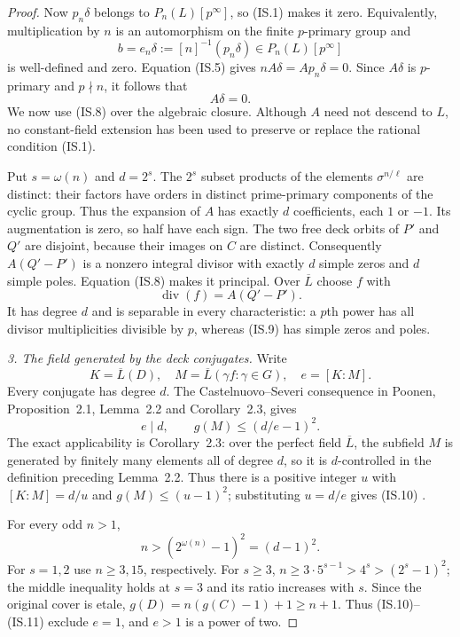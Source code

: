 \begin{proof}
Now $p_n\delta$ belongs to $P_n(L)[p^\infty]$, so (IS.1)
makes it zero. Equivalently, multiplication by $n$ is an
automorphism on the finite $p$-primary group and
\[
 b=e_n\delta:=[n]^{-1}(p_n\delta)
                      \in P_n(L)[p^\infty]
 \tag{IS.7}
\]
is well-defined and zero. Equation (IS.5) gives
$nA\delta=Ap_n\delta=0$. Since $A\delta$ is $p$-primary and
$p\nmid n$, it follows that
\[
                               A\delta=0.
 \tag{IS.8}
\]
We now use (IS.8) over the algebraic closure. Although $A$ need
not descend to $L$, no constant-field extension has been used
to preserve or replace the rational condition (IS.1).

Put $s=\omega(n)$ and $d=2^s$. The $2^s$ subset products of the
elements $\sigma^{n/\ell}$ are distinct: their factors have
orders in distinct prime-primary components of the cyclic
group. Thus the expansion of $A$ has exactly $d$ coefficients,
each $1$ or $-1$. Its augmentation is zero, so half have each
sign. The two free deck orbits of $P'$ and $Q'$ are disjoint,
because their images on $C$ are distinct. Consequently
$A(Q'-P')$ is a nonzero integral divisor with exactly $d$
simple zeros and $d$ simple poles. Equation (IS.8) makes it
principal. Over $\overline L$ choose $f$ with
\[
                       \operatorname{div}(f)=A(Q'-P').
 \tag{IS.9}
\]
It has degree $d$ and is separable in every characteristic:
a $p$th power has all divisor multiplicities divisible by $p$,
whereas (IS.9) has simple zeros and poles.

\emph{3. The field generated by the deck conjugates.}
Write
\[
 K=\overline L(D),\quad
 M=\overline L(\gamma f:\gamma\in G),\quad e=[K:M].
\]
Every conjugate has degree $d$. The Castelnuovo--Severi
consequence in Poonen, Proposition~2.1, Lemma~2.2 and
Corollary~2.3, gives
\[
                    e\mid d,
                    \qquad g(M)\le(d/e-1)^2.
 \tag{IS.10}
\]
The exact applicability is Corollary~2.3: over the perfect field
$\overline L$, the subfield $M$ is generated by finitely many
elements all of degree $d$, so it is $d$-controlled in the
definition preceding Lemma~2.2. Thus there is a positive integer
$u$ with $[K:M]=d/u$ and $g(M)\le(u-1)^2$; substituting
$u=d/e$ gives (IS.10)
\cite[Proposition~2.1, Lemma~2.2 and Corollary~2.3]{Poonen2007Gonality}.

For every odd $n>1$,
\[
                         n>(2^{\omega(n)}-1)^2=(d-1)^2.
 \tag{IS.11}
\]
For $s=1,2$ use $n\ge3,15$, respectively. For $s\ge3$,
$n\ge3\cdot5^{s-1}>4^s>(2^s-1)^2$; the middle inequality
holds at $s=3$ and its ratio increases with $s$.
Since the original cover is etale,
$g(D)=n(g(C)-1)+1\ge n+1$.
Thus (IS.10)--(IS.11) exclude $e=1$, and $e>1$ is a power of two.


\end{proof}

